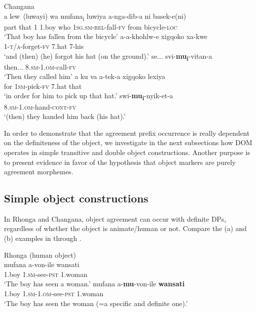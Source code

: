 \documentclass[output=paper]{langsci/langscibook}
\begin{document}
\ea\label{ex:nguna:17}
{Changana}\\
\ea\label{ex:nguna:17a}
\gll a         lew~(luwayi)  wa    mufana\textup{\textsubscript{i}}   luwiya    a-nga-dib-a             ni          basek-e(ni)\\
     part    that                 1      1.boy       who       \textsc{1sg.sm-rel}-fall-\textsc{fv}  from     bicycle-\textsc{loc}\\
\glt ‘That boy has fallen from the bicycle’
\ex\label{ex:nguna:17b} 
\gll a-a-khohlw-e               xigqoko          xa-kwe\\
     1-\textsc{t/a}-forget-\textsc{fv}           7.hat                7-his\\
\glt ‘and (then) (he) forgot his hat (on the ground).’
\ex\label{ex:nguna:17c}
\gll se...         svi-\textbf{mu}\textbf{\textup{\textsubscript{i}}}-vitan-a\\
     then...     8.\textsc{sm-1.om}-call-\textsc{fv}\\
\glt ‘Then they called him’
\ex\label{ex:nguna:17d}
\gll a ku va       a-tek-a              xigqoko       lexiya\\
     for             1\textsc{sm}-pick-\textsc{fv}      7.hat             that\\
\glt ‘in order for him to pick up that hat.’
\ex\label{ex:nguna:17e}
\gll swi-\textbf{mu}\textbf{\textup{\textsubscript{i}}}-nyik-et-a\\
     8.\textsc{sm}-1.\textsc{om}-hand-\textsc{cont}-\textsc{fv}\\
\glt ‘(then) they handed him back (his hat).’
\z
\z

{In order to demonstrate that the agreement prefix occurrence is really dependent on the definiteness of the object, we investigate in the next subsections how DOM operates in simple transitive and double object constructions. Another purpose is to present evidence in favor of the hypothesis that object markers are purely agreement morphemes.}
\subsection{Simple object constructions}\label{sec:nguna:4.1}

In Rhonga and Changana, object agreement can occur with definite DPs, regardless of whether the object is animate/human or not. Compare the (a) and (b) examples in  through .


\ea\label{ex:nguna:18}
\ea
{Rhonga (human object)}\\
\gll mufana         a-von-ile                  wansati\\
     1.boy           1.\textsc{sm}-see-\textsc{pst}            1.woman\\
\glt ‘The boy has seen a woman.’
\ex\label{ex:nguna: }
\gll mufana    a-\textbf{mu}-von-ile             \textbf{wansati}\\
     1.boy     1\textsc{.sm-1.om}-see-\textsc{pst}     1.woman\\
\glt ‘The boy has seen the woman (=a specific and definite one).’
\z
\z
\end{document}
